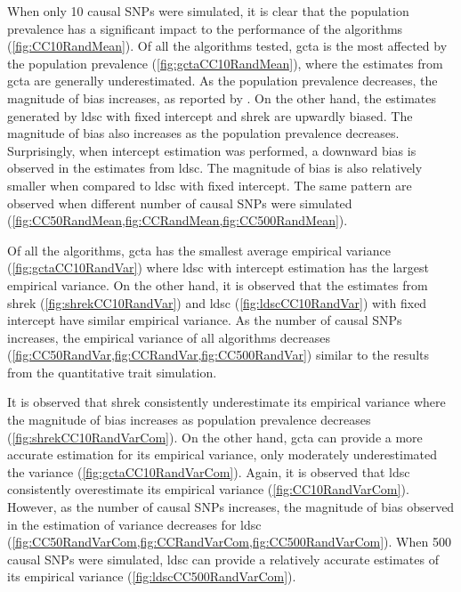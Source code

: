 		When only 10 causal \glspl{SNP} were simulated, it is clear that the population prevalence has a significant impact to the performance of the algorithms (\cref{fig:CC10RandMean}). 
		Of all the algorithms tested, \gls{gcta} is the most affected by the population prevalence (\cref{fig:gctaCC10RandMean}), where the estimates from \gls{gcta} are generally underestimated.
		As the population prevalence decreases, the magnitude of bias increases, as reported by \citet{Golan2014}.
		On the other hand, the estimates generated by \gls{ldsc} with fixed intercept and \gls{shrek} are upwardly biased.
		The magnitude of bias also increases as the population prevalence decreases.
		Surprisingly, when intercept estimation was performed, a downward bias is observed in the estimates from \gls{ldsc}.
		The magnitude of bias is also relatively smaller when compared to \gls{ldsc} with fixed intercept.
		The same pattern are observed when different number of causal \glspl{SNP} were simulated (\cref{fig:CC50RandMean,fig:CCRandMean,fig:CC500RandMean}).
		
		Of all the algorithms, \gls{gcta} has the smallest average empirical variance (\cref{fig:gctaCC10RandVar}) where \gls{ldsc} with intercept estimation has the largest empirical variance.
		On the other hand, it is observed that the estimates from \gls{shrek} (\cref{fig:shrekCC10RandVar}) and \gls{ldsc} (\cref{fig:ldscCC10RandVar}) with fixed intercept have similar empirical variance.
		As the number of causal \glspl{SNP} increases, the empirical variance of all algorithms  decreases (\cref{fig:CC50RandVar,fig:CCRandVar,fig:CC500RandVar}) similar to the results from the quantitative trait simulation.
		
		It is observed that \gls{shrek} consistently underestimate its empirical variance where the magnitude of bias increases as population prevalence decreases  (\cref{fig:shrekCC10RandVarCom}).
		On the other hand, \gls{gcta} can provide a more accurate estimation for its empirical variance, only moderately underestimated the variance  (\cref{fig:gctaCC10RandVarCom}).
		Again, it is observed that \gls{ldsc} consistently overestimate its empirical variance (\cref{fig:CC10RandVarCom}). 
		However, as the number of causal \glspl{SNP} increases, the magnitude of bias observed in the estimation of variance decreases for \gls{ldsc} (\cref{fig:CC50RandVarCom,fig:CCRandVarCom,fig:CC500RandVarCom}). 
		When 500 causal \glspl{SNP} were simulated, \gls{ldsc} can provide a relatively accurate estimates of its empirical variance (\cref{fig:ldscCC500RandVarCom}).
		

